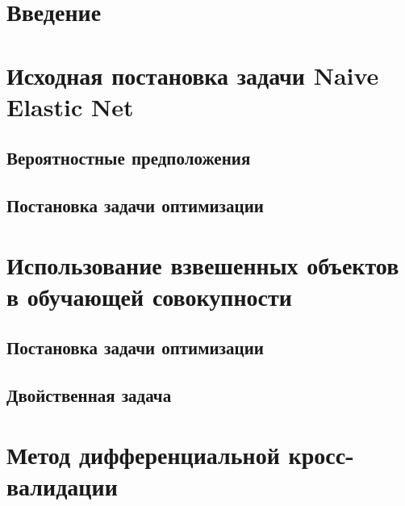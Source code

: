 \documentclass[12pt]{article}
\begin{document}
	
	\newpage \tableofcontents
	\newpage \section{Введение} 

	\section{Исходная постановка задачи Naive Elastic Net}
		\subsection{Вероятностные предположения}	
		\subsection{Постановка задачи оптимизации} 	
	\section{Использование взвешенных объектов в обучающей совокупности}
		\subsection{Постановка задачи оптимизации} 	
		\subsection{Двойственная задача}			
	\section{Метод дифференциальной кросс-валидации}
		
		
		
\end{document}
